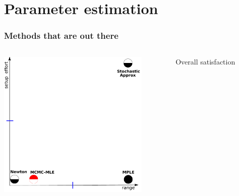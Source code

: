 \documentclass[ 10pt]{beamer}
\newcommand{\yobs}{y_{\text{obs}}}
\begin{document}
\section{Parameter estimation}
%
%
%

\frame
{
\frametitle{Methods that are out there}
\begin{columns}[]
\begin{column}[T]{0.6\textwidth}
\includegraphics[height=2.8in]{mck-final.pdf}
\end{column}
\begin{column}[t]{0.4\textwidth}
{\small
Overall satisfaction
\vspace{1mm}

}
\end{column}
\end{columns}}
\end{document}
